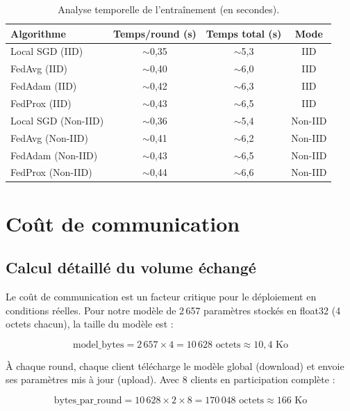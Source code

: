 \documentclass[12pt,a4paper]{report}
\begin{document}
\begin{table}[H]
\centering
\caption{Analyse temporelle de l'entra\^{i}nement (en secondes).}
\label{tab:time_analysis}
\begin{tabular}{lccc}
\toprule
\textbf{Algorithme} & \textbf{Temps/round (s)} & \textbf{Temps total (s)} & \textbf{Mode} \\
\midrule
Local SGD (IID) & $\sim$0,35 & $\sim$5,3 & IID \\
FedAvg (IID)    & $\sim$0,40 & $\sim$6,0 & IID \\
FedAdam (IID)   & $\sim$0,42 & $\sim$6,3 & IID \\
FedProx (IID)   & $\sim$0,43 & $\sim$6,5 & IID \\
Local SGD (Non-IID) & $\sim$0,36 & $\sim$5,4 & Non-IID \\
FedAvg (Non-IID)    & $\sim$0,41 & $\sim$6,2 & Non-IID \\
FedAdam (Non-IID)   & $\sim$0,43 & $\sim$6,5 & Non-IID \\
FedProx (Non-IID)   & $\sim$0,44 & $\sim$6,6 & Non-IID \\
\bottomrule
\end{tabular}
\end{table}

\section{Co\^{u}t de communication}

\subsection{Calcul d\'{e}taill\'{e} du volume \'{e}chang\'{e}}

Le co\^{u}t de communication est un facteur critique pour le d\'{e}ploiement en conditions r\'{e}elles. Pour notre mod\`{e}le de 2\,657 param\`{e}tres stock\'{e}s en float32 (4 octets chacun), la taille du mod\`{e}le est :

\begin{equation}
\text{model\_bytes} = 2\,657 \times 4 = 10\,628 \text{ octets} \approx 10,4 \text{ Ko}
\label{eq:model_bytes}
\end{equation}

\`{A} chaque round, chaque client t\'{e}l\'{e}charge le mod\`{e}le global (download) et envoie ses param\`{e}tres mis \`{a} jour (upload). Avec 8 clients en participation compl\`{e}te :

\begin{equation}
\text{bytes\_par\_round} = 10\,628 \times 2 \times 8 = 170\,048 \text{ octets} \approx 166 \text{ Ko}
\label{eq:bytes_round}
\end{equation}
\end{document}

